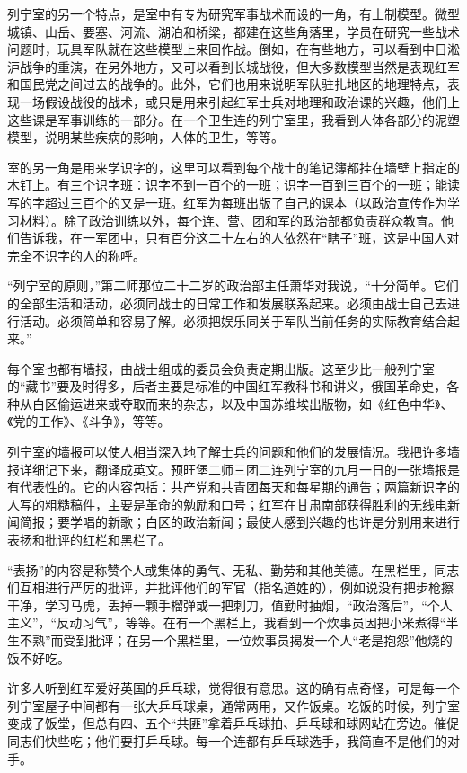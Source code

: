 \documentclass[10pt]{book}
\begin{document}
列宁室的另一个特点，是室中有专为研究军事战术而设的一角，有土制模型。微型城镇、山岳、要塞、河流、湖泊和桥梁，都建在这些角落里，学员在研究一些战术问题时，玩具军队就在这些模型上来回作战。倒如，在有些地方，可以看到中日淞沪战争的重演，在另外地方，又可以看到长城战役，但大多数模型当然是表现红军和国民党之间过去的战争的。此外，它们也用来说明军队驻扎地区的地理特点，表现一场假设战役的战术，或只是用来引起红军士兵对地理和政治课的兴趣，他们上这些课是军事训练的一部分。在一个卫生连的列宁室里，我看到人体各部分的泥塑模型，说明某些疾病的影响，人体的卫生，等等。

室的另一角是用来学识字的，这里可以看到每个战士的笔记簿都挂在墙壁上指定的木钉上。有三个识字班：识字不到一百个的一班；识字一百到三百个的一班；能读写的字超过三百个的又是一班。红军为每班出版了自己的课本（以政治宣传作为学习材料）。除了政治训练以外，每个连、营、团和军的政治部都负责群众教育。他们告诉我，在一军团中，只有百分这二十左右的人依然在“瞎子”班，这是中国人对完全不识字的人的称呼。

“列宁室的原则，”第二师那位二十二岁的政治部主任萧华对我说，“十分简单。它们的全部生活和活动，必须同战士的日常工作和发展联系起来。必须由战士自己去进行活动。必须简单和容易了解。必须把娱乐同关于军队当前任务的实际教育结合起来。”

每个室也都有墙报，由战士组成的委员会负责定期出版。这至少比一般列宁室的“藏书”要及时得多，后者主要是标准的中国红军教科书和讲义，俄国革命史，各种从白区偷运进来或夺取而来的杂志，以及中国苏维埃出版物，如《红色中华》、《党的工作》、《斗争》，等等。

列宁室的墙报可以使人相当深入地了解士兵的问题和他们的发展情况。我把许多墙报详细记下来，翻译成英文。预旺堡二师三团二连列宁室的九月一日的一张墙报是有代表性的。它的内容包括：共产党和共青团每天和每星期的通告；两篇新识字的人写的粗糙稿件，主要是革命的勉励和口号；红军在甘肃南部获得胜利的无线电新闻简报；要学唱的新歌；白区的政治新闻；最使人感到兴趣的也许是分别用来进行表扬和批评的红栏和黑栏了。

“表扬”的内容是称赞个人或集体的勇气、无私、勤劳和其他美德。在黑栏里，同志们互相进行严厉的批评，并批评他们的军官（指名道姓的），例如说没有把步枪擦干净，学习马虎，丢掉一颗手榴弹或一把刺刀，值勤时抽烟，“政治落后”，“个人主义”，“反动习气”，等等。在有一个黑栏上，我看到一个炊事员因把小米煮得“半生不熟”而受到批评；在另一个黑栏里，一位炊事员揭发一个人“老是抱怨”他烧的饭不好吃。

许多人听到红军爱好英国的乒乓球，觉得很有意思。这的确有点奇怪，可是每一个列宁室屋子中间都有一张大乒乓球桌，通常两用，又作饭桌。吃饭的时候，列宁室变成了饭堂，但总有四、五个“共匪”拿着乒乓球拍、乒乓球和球网站在旁边。催促同志们快些吃；他们要打乒乓球。每一个连都有乒乓球选手，我简直不是他们的对手。
\end{document}
